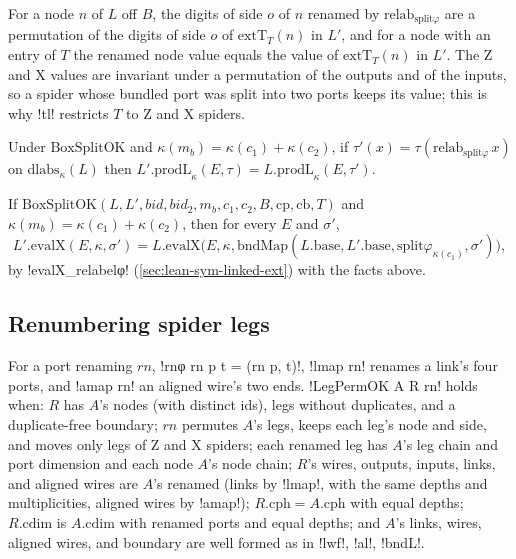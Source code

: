 \begin{theorem}
For a node $n$ of $L$ off $B$, the digits of side $o$ of $n$ renamed by $\mathrm{relab}_{\mathrm{split}\varphi}$ are a permutation of the digits of side $o$ of $\mathrm{extT}_T(n)$ in $L'$, and for a node with an entry of $T$ the renamed node value equals the value of $\mathrm{extT}_T(n)$ in $L'$. The Z and X values are invariant under a permutation of the outputs and of the inputs, so a spider whose bundled port was split into two ports keeps its value; this is why \lean!tl! restricts $T$ to Z and X spiders.
\end{theorem}

\begin{theorem}
Under $\mathrm{BoxSplitOK}$ and $\kappa(m_b)=\kappa(c_1)+\kappa(c_2)$, if $\tau'(x)=\tau(\mathrm{relab}_{\mathrm{split}\varphi}\,x)$ on $\mathrm{dlabs}_\kappa(L)$ then $L'.\mathrm{prodL}_\kappa(E,\tau)=L.\mathrm{prodL}_\kappa(E,\tau')$.
\end{theorem}

\begin{theorem}\label{thm:lean-sym-split}
If $\mathrm{BoxSplitOK}(L,L',\mathit{bid},\mathit{bid}_2,m_b,c_1,c_2,B,\mathrm{cp},\mathrm{cb},T)$ and $\kappa(m_b)=\kappa(c_1)+\kappa(c_2)$, then for every $E$ and $\sigma'$,
\[
L'.\mathrm{evalX}(E,\kappa,\sigma')=L.\mathrm{evalX}\bigl(E,\kappa,\mathrm{bndMap}(L.\mathrm{base},L'.\mathrm{base},\mathrm{split}\varphi_{\kappa(c_1)},\sigma')\bigr),
\]
by \lean!evalX_relabelφ! (\cref{sec:lean-sym-linked-ext}) with the facts above.
\end{theorem}

\subsection{Renumbering spider legs}

\begin{definition}\label{def:lean-sym-legperm}
For a port renaming $\mathit{rn}$, \lean!rnφ rn p t = (rn p, t)!, \lean!lmap rn! renames a link's four ports, and \lean!amap rn! an aligned wire's two ends. \lean!LegPermOK A R rn! holds when: $R$ has $A$'s nodes (with distinct ids), legs without duplicates, and a duplicate-free boundary; $\mathit{rn}$ permutes $A$'s legs, keeps each leg's node and side, and moves only legs of Z and X spiders; each renamed leg has $A$'s leg chain and port dimension and each node $A$'s node chain; $R$'s wires, outputs, inputs, links, and aligned wires are $A$'s renamed (links by \lean!lmap!, with the same depths and multiplicities, aligned wires by \lean!amap!); $R.\mathrm{cph}=A.\mathrm{cph}$ with equal depths; $R.\mathrm{cdim}$ is $A.\mathrm{cdim}$ with renamed ports and equal depths; and $A$'s links, wires, aligned wires, and boundary are well formed as in \lean!lwf!, \lean!al!, \lean!bndL!.
\end{definition}

